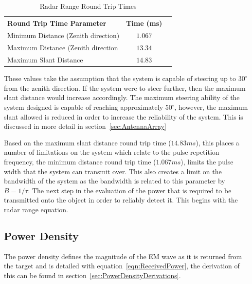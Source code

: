 \documentclass[11pt]{witseiepaper}
\begin{document}
\begin{bibunit}[witseie]
\begin{table}[htb]
    \caption{Radar Range Round Trip Times}
    \label{tab:RadarRangeValues}
    \begin{center}
        \begin{tabular}{p{70mm}cp{70mm}}
            \hline 
            Round Trip Time Parameter & Time (ms) \\
            \hline
            Minimum Distance (Zenith direction) & $1.067$ \\
            Maximum Distance  (Zenith direction & $13.34$ \\
            Maximum Slant Distance & $14.83$ \\
            \hline
        \end{tabular}
    \end{center}
\end{table}
These values take the assumption that the system is capable of steering up to $30^{\circ}$ from the zenith direction. If the system were to steer further, then the maximum slant distance would increase accordingly. The maximum steering ability of the system designed is capable of reaching approximately $50^{\circ}$, however, the maximum slant allowed is reduced in order to increase the reliability of the system. This is discussed in more detail in section~\ref{sec:AntennaArray} %

Based on the maximum slant distance round trip time ($14.83 ms$), this places a number of limitations on the system which relate to the pulse repetition frequency, the minimum distance round trip time ($1.067 ms$), limits the pulse width that the system can transmit over. This also creates a limit on the bandwidth of the system as the bandwidth is related to this parameter by $B = 1/ \tau$.
The next step in the evaluation of the power that is required to be transmitted onto the object in order to reliably detect it. This begins with the radar range equation.

\subsection{Power Density} \label{sec:PowerDensity}
The power density defines the magnitude of the EM wave as it is returned from the target and is detailed with equation~\ref{eqn:ReceivedPower}, the derivation of this can be found in section~\ref{sec:PowerDensityDerivations}. 


\end{bibunit}
\end{document}
